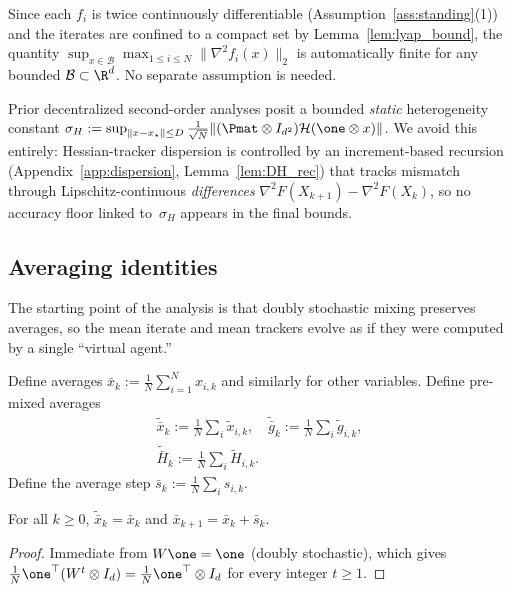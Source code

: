 \documentclass[review,onefignum,onetabnum]{siamart171218}
\begin{document}
	\begin{remark}
		Since each $f_i$ is twice continuously differentiable (Assumption~\ref{ass:standing}(1))
		and the iterates are confined to a compact set by Lemma~\ref{lem:lyap_bound},
		the quantity $\sup_{x\in\mathcal B}\max_{1\le i\le N}\|\nabla^2 f_i(x)\|_2$
		is automatically finite for any bounded $\mathcal B\subset\R^d$.
		No separate assumption is needed.
	\end{remark}

	\begin{remark}
		Prior decentralized second-order analyses
		\citep{mokhtari2016esom,sun2022sonata,ye2023networkgiant} posit a bounded
		\emph{static} heterogeneity constant
		$\sigma_H:=\sup_{\|x-x_\star\|\le D}
		  \frac{1}{\sqrt N}\|(\Pmat\otimes I_{d^2})\mathcal H(\one\otimes x)\|$.
		We avoid this entirely: Hessian-tracker dispersion is controlled
		by an increment-based recursion
		(Appendix~\ref{app:dispersion}, Lemma~\ref{lem:DH_rec})
		that tracks mismatch through Lipschitz-continuous
		\emph{differences} $\nabla^2 F(X_{k+1})-\nabla^2 F(X_k)$,
		so no accuracy floor linked to~$\sigma_H$ appears in the
		final bounds.
	\end{remark}

\subsection{Averaging identities}\label{ssec:avg}
The starting point of the analysis is that doubly stochastic mixing
preserves averages, so the mean iterate and mean trackers evolve as if
they were computed by a single ``virtual agent.''

Define averages $\bar x_k:=\frac1N\sum_{i=1}^N x_{i,k}$ and similarly for other variables.
Define pre-mixed averages
\begin{gather*}
\tilde{\bar x}_k:=\tfrac1N\!\sum_i \tilde x_{i,k},\quad
\tilde{\bar g}_k:=\tfrac1N\!\sum_i \tilde g_{i,k},\\
\tilde{\bar H}_k:=\tfrac1N\!\sum_i \tilde H_{i,k}.
\end{gather*}
Define the average step $\bar s_k:=\frac1N\sum_i s_{i,k}$.

\begin{lemma}\label{lem:avg-pres}
For all $k\ge0$, $\tilde{\bar x}_k=\bar x_k$ and $\bar x_{k+1}=\bar x_k+\bar s_k$.
\end{lemma}
\begin{proof}
Immediate from $W\one=\one$ (doubly stochastic),
which gives $\frac1N\one^\top(W^t\otimes I_d)=\frac1N\one^\top\otimes I_d$
for every integer $t\ge 1$.
\end{proof}
\end{document}
